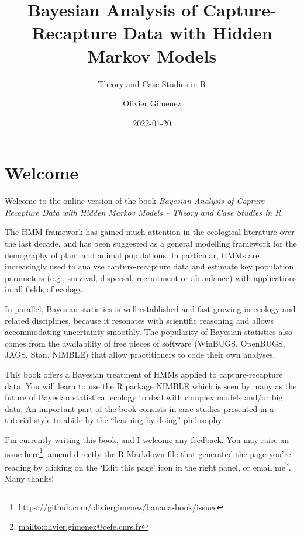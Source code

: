 \documentclass[
  12pt,
]{krantz}
\title{Bayesian Analysis of Capture-Recapture Data with Hidden Markov Models}
\subtitle{Theory and Case Studies in R}
\author{Olivier Gimenez}
\date{2022-01-20}
\renewcommand{\href}[2]{#2\footnote{\url{#1}}}
\begin{document}
\maketitle

\thispagestyle{empty}

\setlength{\abovedisplayskip}{-5pt}
\setlength{\abovedisplayshortskip}{-5pt}

{
\hypersetup{linkcolor=}
\setcounter{tocdepth}{2}
\tableofcontents
}
\listoftables
\listoffigures
\hypertarget{welcome}{%
\chapter*{Welcome}\label{welcome}}


Welcome to the online version of the book \emph{Bayesian Analysis of Capture-Recapture Data with Hidden Markov Models -- Theory and Case Studies in R}.

The HMM framework has gained much attention in the ecological literature over the last decade, and has been suggested as a general modelling framework for the demography of plant and animal populations. In particular, HMMs are increasingly used to analyse capture-recapture data and estimate key population parameters (e.g., survival, dispersal, recruitment or abundance) with applications in all fields of ecology.

In parallel, Bayesian statistics is well established and fast growing in ecology and related disciplines, because it resonates with scientific reasoning and allows accommodating uncertainty smoothly. The popularity of Bayesian statistics also comes from the availability of free pieces of software (WinBUGS, OpenBUGS, JAGS, Stan, NIMBLE) that allow practitioners to code their own analyses.

This book offers a Bayesian treatment of HMMs applied to capture-recapture data. You will learn to use the R package NIMBLE which is seen by many as the future of Bayesian statistical ecology to deal with complex models and/or big data. An important part of the book consists in case studies presented in a tutorial style to abide by the ``learning by doing'' philosophy.

I'm currently writing this book, and I welcome any feedback. You may raise an issue \href{https://github.com/oliviergimenez/banana-book/issues}{here}, amend directly the R Markdown file that generated the page you're reading by clicking on the `Edit this page' icon in the right panel, or \href{mailto:olivier.gimenez@cefe.cnrs.fr}{email me}. Many thanks!
\end{document}
